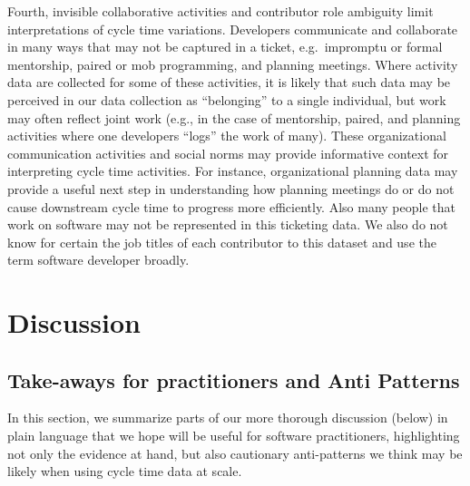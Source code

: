 \documentclass[manuscript,screen,review]{acmart}
\begin{document}
Fourth, invisible collaborative activities and contributor role
ambiguity limit interpretations of cycle time variations. Developers
communicate and collaborate in many ways that may not be captured in a
ticket, e.g.~impromptu or formal mentorship, paired or mob programming,
and planning meetings. Where activity data are collected for some of
these activities, it is likely that such data may be perceived in our
data collection as ``belonging'' to a single individual, but work may
often reflect joint work (e.g., in the case of mentorship, paired, and
planning activities where one developers ``logs'' the work of many).
These organizational communication activities and social norms may
provide informative context for interpreting cycle time activities. For
instance, organizational planning data may provide a useful next step in
understanding how planning meetings do or do not cause downstream cycle
time to progress more efficiently. Also many people that work on
software may not be represented in this ticketing data. We also do not
know for certain the job titles of each contributor to this dataset and
use the term software developer broadly.

\section{Discussion}\label{discussion}

\subsection{Take-aways for practitioners and Anti
Patterns}\label{take-aways-for-practitioners-and-anti-patterns}

In this section, we summarize parts of our more thorough discussion
(below) in plain language that we hope will be useful for software
practitioners, highlighting not only the evidence at hand, but also
cautionary anti-patterns we think may be likely when using cycle time
data at scale.
\end{document}
